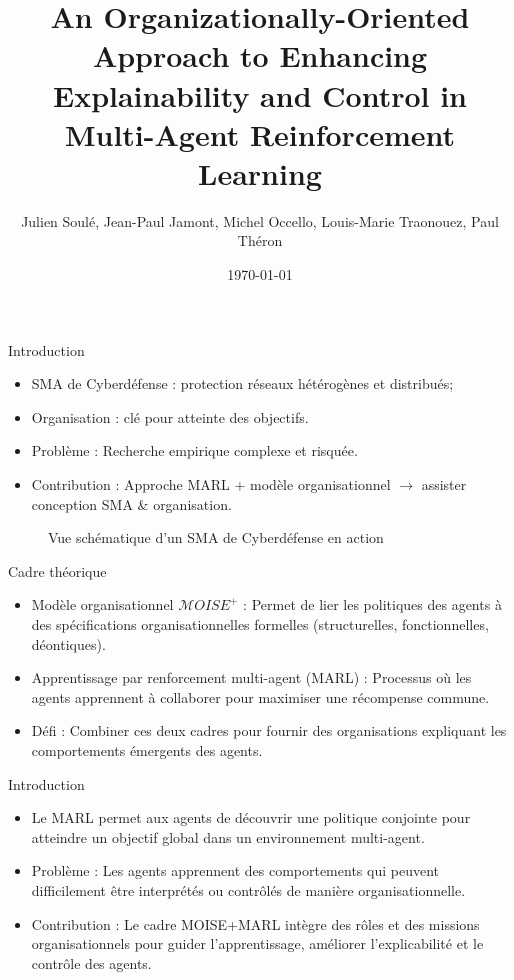 \documentclass{beamer}
\title{An Organizationally-Oriented Approach to Enhancing Explainability and Control in Multi-Agent Reinforcement Learning}
\author{Julien Soulé, Jean-Paul Jamont, Michel Occello, Louis-Marie Traonouez, Paul Théron}
\date{\today}
\begin{document}
\begin{frame}
  \titlepage
\end{frame}

\begin{frame}{Introduction}
    \begin{itemize}
        \item SMA de Cyberdéfense : protection réseaux hétérogènes et distribués;
        \item Organisation : clé pour atteinte des objectifs.
        \item Problème : Recherche empirique complexe et risquée.
        \item Contribution : Approche MARL + modèle organisationnel $\rightarrow$ assister conception SMA \& organisation.
    \end{itemize}

    \begin{figure}
        \centering
        
        \caption{Vue schématique d'un SMA de Cyberdéfense en action}
        \label{fig:my_label}
    \end{figure}

\end{frame}

\begin{frame}{Cadre théorique}
    \begin{itemize}
        \item Modèle organisationnel $\mathcal{M}OISE^+$ : Permet de lier les politiques des agents à des spécifications organisationnelles formelles (structurelles, fonctionnelles, déontiques).
        \item Apprentissage par renforcement multi-agent (MARL) : Processus où les agents apprennent à collaborer pour maximiser une récompense commune.
        \item Défi : Combiner ces deux cadres pour fournir des organisations expliquant les comportements émergents des agents.
    \end{itemize}
\end{frame}


\begin{frame}{Introduction}
    \begin{itemize}
        \item Le MARL permet aux agents de découvrir une politique conjointe pour atteindre un objectif global dans un environnement multi-agent.
        \item Problème : Les agents apprennent des comportements qui peuvent difficilement être interprétés ou contrôlés de manière organisationnelle.
        \item Contribution : Le cadre MOISE+MARL intègre des rôles et des missions organisationnels pour guider l'apprentissage, améliorer l'explicabilité et le contrôle des agents.
    \end{itemize}
\end{frame}
\end{document}
